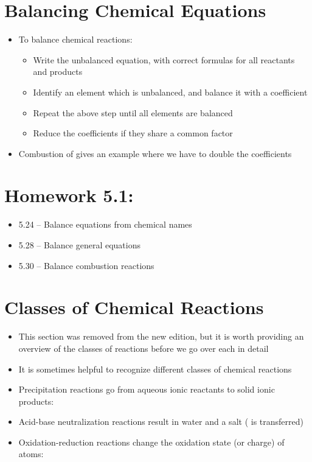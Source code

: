 \documentclass[12pt, openany, letterpaper]{memoir}
\begin{document}
\section{Balancing Chemical Equations}
\begin{itemize}
	\item To balance chemical reactions:
	      \begin{itemize}
		      \item Write the unbalanced equation, with correct formulas for all reactants and products
		      \item Identify an element which is unbalanced, and balance it with a coefficient
		      \item Repeat the above step until all elements are balanced
		      \item Reduce the coefficients if they share a common factor
	      \end{itemize}
	\item Combustion of  gives an example where we have to double the coefficients
\end{itemize}

\section*{Homework 5.1:}
\begin{itemize}
	\item 5.24 -- Balance equations from chemical names
	\item 5.28 -- Balance general equations
	\item 5.30 -- Balance combustion reactions
\end{itemize}

\section*{Classes of Chemical Reactions}
\begin{itemize}
	\item This section was removed from the new edition, but it is worth providing an overview of the classes of reactions before we go over each in detail
	\item It is sometimes helpful to recognize different classes of chemical reactions
	\item Precipitation reactions go from aqueous ionic reactants to solid ionic products:

	\item Acid-base neutralization reactions result in water and a salt ( is transferred)

	\item Oxidation-reduction reactions change the oxidation state (or charge) of atoms:

\end{itemize}
\end{document}
